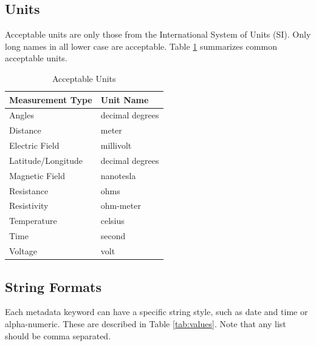 \documentclass[12pt]{article}
\begin{document}
\subsection{Units}
Acceptable units are only those from the International System of Units (SI).  Only long names in all lower case are acceptable.  Table \ref{tab:units} summarizes common acceptable units.


\begin{table}[!h]
	\centering
	\caption[Acceptable Units]{Acceptable Units}
	\begin{tabular}{ll}
		\toprule
		\textbf{Measurement Type} & \textbf{Unit Name} \\ \midrule
		Angles & decimal degrees \\ \midrule
		
		Distance &  meter  \\ \midrule
		Electric Field & millivolt\\ \midrule
		Latitude/Longitude & decimal degrees \\ \midrule
		Magnetic Field & nanotesla \\ \midrule
		Resistance & ohms   \\ \midrule
		Resistivity & ohm-meter \\ \midrule
		Temperature & celsius\\ \midrule
		Time & second\\ \midrule
		Voltage & volt \\ \bottomrule
		
		
	\end{tabular}
	\label{tab:units}
\end{table}

\subsection{String Formats}

Each metadata keyword can have a specific string style, such as date and time or alpha-numeric.  These are described in Table \ref{tab:values}.  Note that any list should be comma separated.
\end{document}
